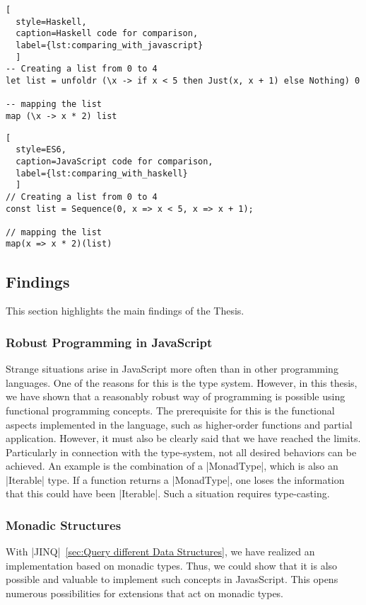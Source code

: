 \begin{lstlisting}[
  style=Haskell, 
  caption=Haskell code for comparison, 
  label={lst:comparing_with_javascript}
  ]
-- Creating a list from 0 to 4
let list = unfoldr (\x -> if x < 5 then Just(x, x + 1) else Nothing) 0

-- mapping the list
map (\x -> x * 2) list 
\end{lstlisting}

\begin{lstlisting}[
  style=ES6, 
  caption=JavaScript code for comparison,
  label={lst:comparing_with_haskell}
  ]
// Creating a list from 0 to 4
const list = Sequence(0, x => x < 5, x => x + 1);

// mapping the list
map(x => x * 2)(list)
\end{lstlisting}

\subsection{Findings}
\label{sub:Findings}
This section highlights the main findings of the Thesis.

\subsubsection{Robust Programming in JavaScript}
\label{subsub:Robust Programming in JavaScript}
Strange situations arise in JavaScript more often than in other programming
languages. One of the reasons for this is the type system. However, in this
thesis, we have shown that a reasonably robust way of programming is possible
using functional programming concepts. The prerequisite for this is the
functional aspects implemented in the language, such as higher-order functions
and partial application. However, it must also be clearly said that we have
reached the limits. Particularly in connection with the type-system,
not all desired behaviors can be achieved.
An example is the combination of a |MonadType|, which is also an |Iterable|
type. If a function returns a |MonadType|, one loses the information that this
could have been |Iterable|. Such a situation requires type-casting.

\subsubsection{Monadic Structures}
\label{subsub:Monadic Structures}
With |JINQ|~\ref{sec:Query different Data Structures}, we have realized an
implementation based on monadic types. Thus, we could show that it is also
possible and valuable to implement such concepts in JavasScript.
This opens numerous possibilities for extensions that act on monadic types.

